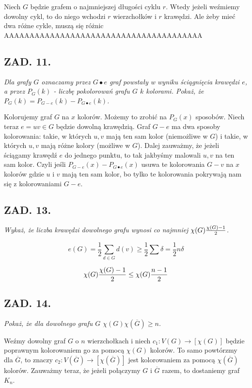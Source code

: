 \documentclass{article}
\begin{document}
\medskip

Niech $G$ będzie grafem o najmniejszej długości cyklu $r$. Wtedy jeżeli weźmiemy dowolny cykl, to do niego wchodzi $r$ wierzchołków i $r$ krawędzi. Ale żeby mieć dwa różne cykle, muszą się różnic AAAAAAAAAAAAAAAAAAAAAAAAAAAAAAAAAAAAAAA


\subsection*{ZAD. 11.}
\emph{Dla grafy $G$ oznaczamy przez $G\bullet e$ graf powstały w wyniku ściągnięcia krawędzi $e$, a przez $P_G(k)$ - liczbę pokolorowań grafu $G$ $k$ kolorami. Pokaż, że $P_G(k)=P_{G-e}(k)-P_{G\bullet e}(k)$.}
\medskip

\medskip

Kolorujemy graf $G$ na $x$ kolorów. Możemy to zrobić na $P_G(x)$ sposobów. Niech teraz $e=uv\in G$ będzie dowolną krawędzią. Graf $G-e$ ma dwa sposoby kolorowania: takie, w których $u,v$ mają ten sam kolor (niemożliwe w $G$) i takie, w których $u,v$ mają różne kolory (możliwe w $G$). Dalej zauważmy, że jeżeli ściągamy krawędź $e$ do jednego punktu, to tak jakbyśmy malowali $u,v$ na ten sam kolor. Czyli jeśli $P_{G-e}(x)-P_{G\bullet e}(x)$ usuwa te kolorowania $G-v$ na $x$ kolorów gdzie $u$ i $v$ mają ten sam kolor, bo tylko te kolorowania pokrywają nam się z kolorowaniami $G-e$.

\subsection*{ZAD. 13.}
\emph{Wykaż, że liczba krawędzi dowolnego grafu wynosi co najmniej $\chi(G){\chi(G)-1\over2}$.}
\medskip

\medskip

$$e(G)=\frac12\sum_{d\in G} d(v)\geq \frac12\sum \delta=\frac12n\delta$$

$$\chi(G){\chi(G)-1\over2}\leq\chi(G){n-1\over 2}$$

\subsection*{ZAD. 14.}
\emph{Pokaż, że dla dowolnego grafu $G$ $\chi(G)\chi(\overline G)\geq n$.}
\medskip

\medskip

Weźmy dowolny graf $G$ o $n$ wierzchołkach i niech $c_1:V(G)\to [\chi(G)]$ będzie poprawnym kolorowaniem go za pomocą $\chi(G)$ kolorów. To samo powtórzmy dla $\overline G$, to znaczy $c_2:V(\overline G)\to[\chi(\overline G)]$ jest kolorowaniem za pomocą $\chi(\overline G)$ kolorów. Zauważmy teraz, że jeżeli połączymy $G$ i $\overline G$ razem, to dostaniemy graf $K_n$. 
\smallskip
\end{document}
